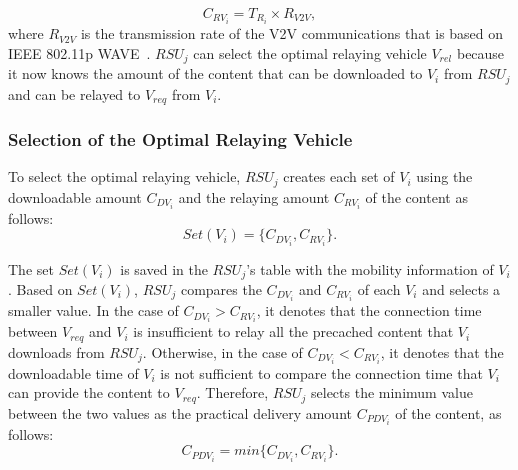 \documentclass[electronics,aricle,accept,pdftex,moreauthors]{Definitions/mdpi}
\begin{document}
\begin{equation}
     {C}_{{RV}_{i}}={T}_{{R}_{i}}\times{R}_{V2V}, %
\end{equation}
where ${R}_{V2V}$ is the transmission rate of the V2V communications that is based on IEEE 802.11p WAVE~\cite{wave2016}.
$RSU_{j}$ can select the optimal relaying vehicle $V_{rel}$ because it now knows the amount of the content that can be downloaded to $V_{i}$ from $RSU_{j}$ and can be relayed to $V_{req}$ from $V_{i}$.


\subsubsection{Selection of the Optimal Relaying Vehicle} \label{sec3.2.3}
To select the optimal relaying vehicle, $RSU_{j}$ creates each set of $V_{i}$ using the downloadable amount ${C}_{{DV}_{i}}$ and the relaying amount ${C}_{{RV}_{i}}$ of the content as follows:
\begin{equation}
    Set({V}_{i})=\{{C}_{{DV}_{i}},{C}_{{RV}_{i}}\}.%
\end{equation}

The set $Set(V_{i})$ is saved in the $RSU_{j}$'s table with the mobility information of $V_{i}$.
Based on $Set(V_{i})$, $RSU_{j}$ compares the ${C}_{{DV}_{i}}$ and ${C}_{{RV}_{i}}$ of each $V_{i}$ and selects a smaller value.
In the case of ${C}_{{DV}_{i}} > {C}_{{RV}_{i}}$, it denotes that the connection time between $V_{req}$ and $V_{i}$ is insufficient to relay all the precached content that $V_{i}$ downloads from $RSU_{j}$.
Otherwise, in the case of ${C}_{{DV}_{i}} < {C}_{{RV}_{i}}$, it denotes that the downloadable time of $V_{i}$ is not sufficient to compare the connection time that $V_{i}$ can provide the content to $V_{req}$.
Therefore, $RSU_{j}$ selects the minimum value between the two values as the practical delivery amount ${C}_{{PDV}_{i}}$ of the content, as follows:
\begin{equation}
    {C}_{{PDV}_{i}}=min\{{C}_{{DV}_{i}},{C}_{{RV}_{i}}\}. %
\end{equation}
\end{document}
